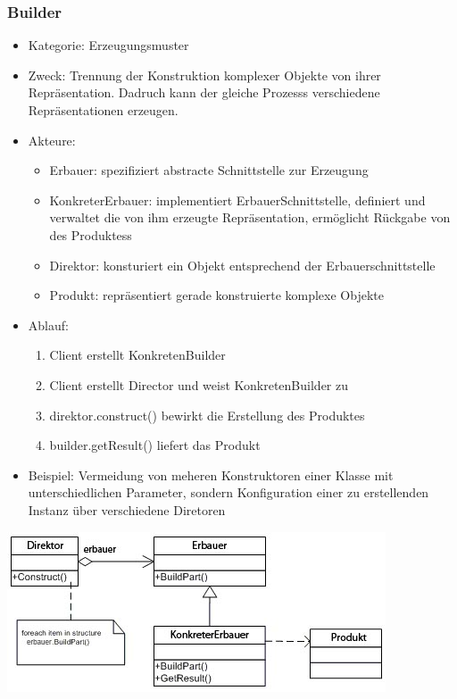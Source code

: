 \documentclass[11pt, fleqn, a4paper, leqno]{scrartcl} %
\begin{document}
		\subsubsection{Builder}
			\begin{itemize}
				\item Kategorie: Erzeugungsmuster
				\item Zweck: Trennung der Konstruktion komplexer Objekte von ihrer Repräsentation. Dadruch kann der gleiche Prozesss verschiedene Repräsentationen erzeugen.
				\item Akteure: 
					\begin{itemize}
						\item Erbauer: spezifiziert abstracte Schnittstelle zur Erzeugung
						\item KonkreterErbauer: implementiert ErbauerSchnittstelle, definiert und verwaltet die von ihm erzeugte Repräsentation, ermöglicht Rückgabe von des Produktess
						\item Direktor: konsturiert ein Objekt entsprechend der Erbauerschnittstelle
						\item Produkt: repräsentiert gerade konstruierte komplexe Objekte
					\end{itemize}
				\item Ablauf:
					\begin{enumerate}
						\item Client erstellt KonkretenBuilder
						\item Client erstellt Director und weist KonkretenBuilder zu
						\item direktor.construct() bewirkt die Erstellung des Produktes
						\item builder.getResult() liefert das Produkt 
					\end{enumerate}
				\item Beispiel: Vermeidung von meheren Konstruktoren einer Klasse mit unterschiedlichen Parameter, sondern Konfiguration einer zu erstellenden Instanz über verschiedene Diretoren
			\end{itemize}
			\includegraphics{images/builder.jpg}
			\newpage
\end{document}
